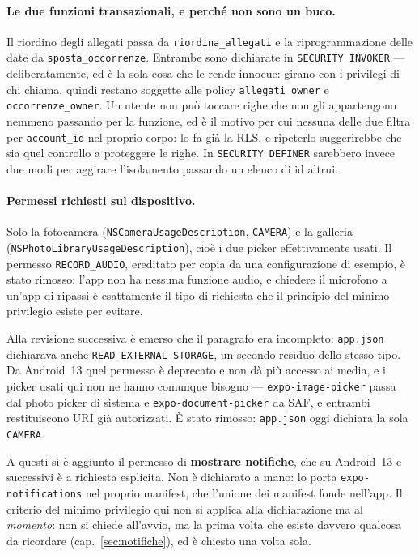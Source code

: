 \documentclass[11pt,a4paper]{report}
\begin{document}
\paragraph{Le due funzioni transazionali, e perch\'e non sono un buco.} Il
riordino degli allegati passa da \texttt{riordina\_allegati} e la
riprogrammazione delle date da \texttt{sposta\_occorrenze}. Entrambe sono
dichiarate in \texttt{SECURITY INVOKER} --- deliberatamente, ed \`e la sola
cosa che le rende innocue: girano con i privilegi di chi chiama, quindi restano
soggette alle policy \texttt{allegati\_owner} e \texttt{occorrenze\_owner}. Un
utente non pu\`o toccare righe che non gli appartengono nemmeno passando per la
funzione, ed \`e il motivo per cui nessuna delle due filtra per
\texttt{account\_id} nel proprio corpo: lo fa gi\`a la RLS, e ripeterlo
suggerirebbe che sia quel controllo a proteggere le righe. In
\texttt{SECURITY DEFINER} sarebbero invece due modi per aggirare l'isolamento
passando un elenco di id altrui.

\paragraph{Permessi richiesti sul dispositivo.} Solo la fotocamera
(\texttt{NSCameraUsageDescription}, \texttt{CAMERA}) e la galleria
(\texttt{NSPhotoLibraryUsageDescription}), cio\`e i due picker effettivamente
usati. Il permesso \texttt{RECORD\_AUDIO}, ereditato per copia da una
configurazione di esempio, \`e stato rimosso: l'app non ha nessuna funzione
audio, e chiedere il microfono a un'app di ripassi \`e esattamente il tipo di
richiesta che il principio del minimo privilegio esiste per evitare.

Alla revisione successiva \`e emerso che il paragrafo era incompleto:
\texttt{app.json} dichiarava anche \texttt{READ\_EXTERNAL\_STORAGE}, un
secondo residuo dello stesso tipo. Da Android~13 quel permesso \`e deprecato e
non d\`a pi\`u accesso ai media, e i picker usati qui non ne hanno comunque
bisogno --- \texttt{expo-image-picker} passa dal photo picker di sistema e
\texttt{expo-document-picker} da SAF, e entrambi restituiscono URI gi\`a
autorizzati. \`E stato rimosso: \texttt{app.json} oggi dichiara la sola
\texttt{CAMERA}.

A questi si \`e aggiunto il permesso di \textbf{mostrare notifiche}, che su
Android~13 e successivi \`e a richiesta esplicita. Non \`e dichiarato a mano:
lo porta \texttt{expo-notifications} nel proprio manifest, che l'unione dei
manifest fonde nell'app. Il criterio del minimo privilegio qui non si applica
alla dichiarazione ma al \emph{momento}: non si chiede all'avvio, ma la prima
volta che esiste davvero qualcosa da ricordare (cap.~\ref{sec:notifiche}), ed
\`e chiesto una volta sola.
\end{document}
